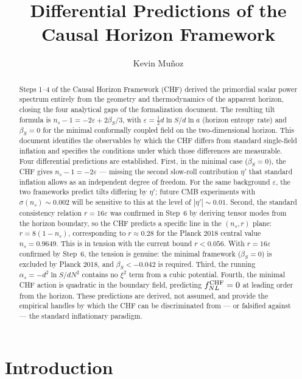 \documentclass[12pt,a4paper]{article}
\title{Differential Predictions of the Causal Horizon Framework}
\author{Kevin Mu\~noz}
\date{}
\begin{document}
\maketitle

\begin{abstract}
Steps 1--4 of the Causal Horizon Framework (CHF) derived the primordial scalar power spectrum entirely from the geometry and thermodynamics of the apparent horizon, closing the four analytical gaps of the formalization document. The resulting tilt formula is $n_s - 1 = -2\varepsilon + 2\beta_S/3$, with $\varepsilon = \frac{1}{2}d\ln S/d\ln a$ (horizon entropy rate) and $\beta_S = 0$ for the minimal conformally coupled field on the two-dimensional horizon. This document identifies the observables by which the CHF differs from standard single-field inflation and specifies the conditions under which those differences are measurable. Four differential predictions are established. First, in the minimal case ($\beta_S = 0$), the CHF gives $n_s - 1 = -2\varepsilon$ --- missing the second slow-roll contribution $\eta'$ that standard inflation allows as an independent degree of freedom. For the same background $\varepsilon$, the two frameworks predict tilts differing by $\eta'$; future CMB experiments with $\sigma(n_s) \sim 0.002$ will be sensitive to this at the level of $|\eta'| \sim 0.01$. Second, the standard consistency relation $r = 16\varepsilon$ was confirmed in Step~6 by deriving tensor modes from the horizon boundary, so the CHF predicts a specific line in the $(n_s, r)$ plane: $r = 8(1 - n_s)$, corresponding to $r \approx 0.28$ for the Planck 2018 central value $n_s = 0.9649$. This is in tension with the current bound $r < 0.056$. With $r = 16\varepsilon$ confirmed by Step~6, the tension is genuine: the minimal framework ($\beta_S = 0$) is excluded by Planck 2018, and $\beta_S < -0.042$ is required. Third, the running $\alpha_s = -d^2\ln S/dN^2$ contains no $\xi^2$ term from a cubic potential. Fourth, the minimal CHF action is quadratic in the boundary field, predicting $f_{NL}^{\rm CHF} = 0$ at leading order from the horizon. These predictions are derived, not assumed, and provide the empirical handles by which the CHF can be discriminated from --- or falsified against --- the standard inflationary paradigm.
\end{abstract}

\section{Introduction}
\end{document}

